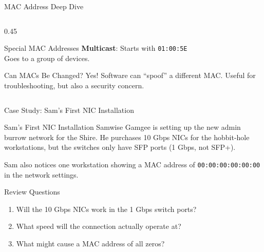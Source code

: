 \documentclass[aspectratio=169]{beamer}  %
\begin{document}
\begin{frame}{MAC Address Deep Dive}
\begin{columns}[T]
\begin{column}{0.45\textwidth}
\begin{block}{Special MAC Addresses}
                \vspace{0.3em}
                \textbf{Multicast}: Starts with \texttt{01:00:5E} \\
                Goes to a group of devices.
            \end{block}
            
            \vspace{0.3em}
            \begin{alertblock}{Can MACs Be Changed?}
                Yes! Software can ``spoof'' a different MAC. Useful for troubleshooting, but also a security concern.
            \end{alertblock}
        \end{column}
    \end{columns}
\end{frame}

\begin{frame}{Case Study: Sam's First NIC Installation}
    \begin{casestudy}{Sam's First NIC Installation}
        Samwise Gamgee is setting up the new admin burrow network for the Shire. He purchases 10 Gbps NICs for the hobbit-hole workstations, but the switches only have SFP ports (1 Gbps, not SFP+).
        
        \vspace{0.5em}
        Sam also notices one workstation showing a MAC address of \texttt{00:00:00:00:00:00} in the network settings.
    \end{casestudy}
    
    \begin{block}{Review Questions}
        \begin{enumerate}
            \item Will the 10 Gbps NICs work in the 1 Gbps switch ports?
            \item What speed will the connection actually operate at?
            \item What might cause a MAC address of all zeros?
        \end{enumerate}
    \end{block}
\end{frame}
\end{document}
